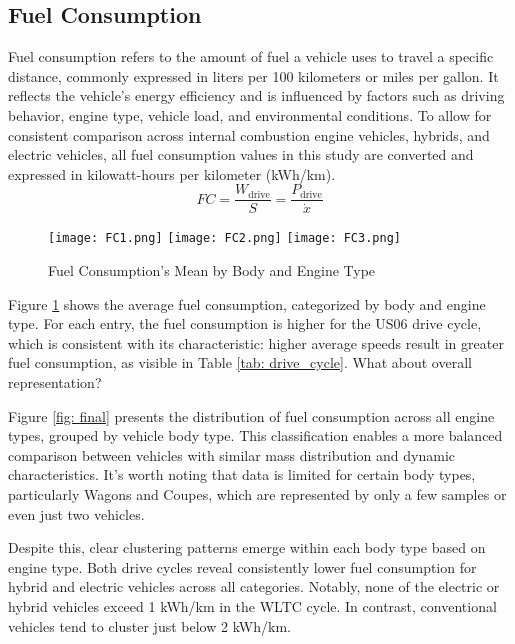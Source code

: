 \subsection*{Fuel Consumption}
	Fuel consumption refers to the amount of fuel a vehicle uses to travel a specific distance, commonly expressed in liters per 100 kilometers or miles per gallon. It reflects the vehicle’s energy efficiency and is influenced by factors such as driving behavior, engine type, vehicle load, and environmental conditions. To allow for consistent comparison across internal combustion engine vehicles, hybrids, and electric vehicles, all fuel consumption values in this study are converted and expressed in kilowatt-hours per kilometer (kWh/km).
	\begin{equation*}
		FC = \frac{W_{\text{drive}}}{S} = \frac{P_{\text{drive}}}{\dot x}
	\end{equation*}
	\begin{figure}[H]
		\begin{center}
			\texttt{[image: FC1.png]}
			\texttt{[image: FC2.png]}
			\texttt{[image: FC3.png]}
		\end{center}
		\caption{Fuel Consumption's Mean by Body and Engine Type}
		\label{fig: FC}
	\end{figure}
		Figure \ref{fig: FC} shows the average fuel consumption, categorized by body and engine type. For each entry, the fuel consumption is higher for the US06 drive cycle, which is consistent with its characteristic: higher average speeds result in greater fuel consumption, as visible in Table \ref{tab: drive_cycle}. What about overall representation?
		
		Figure \ref{fig: final} presents the distribution of fuel consumption across all engine types, grouped by vehicle body type. This classification enables a more balanced comparison between vehicles with similar mass distribution and dynamic characteristics. It’s worth noting that data is limited for certain body types, particularly Wagons and Coupes, which are represented by only a few samples or even just two vehicles.
		
		Despite this, clear clustering patterns emerge within each body type based on engine type. Both drive cycles reveal consistently lower fuel consumption for hybrid and electric vehicles across all categories. Notably, none of the electric or hybrid vehicles exceed 1 kWh/km in the WLTC cycle. In contrast, conventional vehicles tend to cluster just below 2 kWh/km.
		
